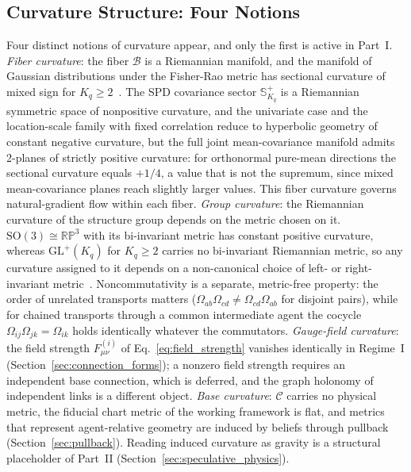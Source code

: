 \subsection{Curvature Structure: Four Notions}

Four distinct notions of curvature appear, and only the first is active in Part~I. \emph{Fiber curvature}: the fiber $\mathcal{B}$ is a Riemannian manifold, and the manifold of Gaussian distributions under the Fisher-Rao metric has sectional curvature of mixed sign for $K_q \geq 2$~\cite{Skovgaard1984}. The SPD covariance sector $\mathbb{S}^+_{K_q}$ is a Riemannian symmetric space of nonpositive curvature, and the univariate case and the location-scale family with fixed correlation reduce to hyperbolic geometry of constant negative curvature, but the full joint mean-covariance manifold admits 2-planes of strictly positive curvature: for orthonormal pure-mean directions the sectional curvature equals $+1/4$, a value that is not the supremum, since mixed mean-covariance planes reach slightly larger values. This fiber curvature governs natural-gradient flow within each fiber. \emph{Group curvature}: the Riemannian curvature of the structure group depends on the metric chosen on it. $\mathrm{SO}(3) \cong \mathbb{RP}^3$ with its bi-invariant metric has constant positive curvature, whereas $\mathrm{GL}^+(K_q)$ for $K_q \geq 2$ carries no bi-invariant Riemannian metric, so any curvature assigned to it depends on a non-canonical choice of left- or right-invariant metric~\cite{Milnor1976}. Noncommutativity is a separate, metric-free property: the order of unrelated transports matters ($\Omega_{ab}\Omega_{cd} \neq \Omega_{cd}\Omega_{ab}$ for disjoint pairs), while for chained transports through a common intermediate agent the cocycle $\Omega_{ij}\Omega_{jk} = \Omega_{ik}$ holds identically whatever the commutators. \emph{Gauge-field curvature}: the field strength $F^{(i)}_{\mu\nu}$ of Eq.~\eqref{eq:field_strength} vanishes identically in Regime~I (Section~\ref{sec:connection_forms}); a nonzero field strength requires an independent base connection, which is deferred, and the graph holonomy of independent links is a different object. \emph{Base curvature}: $\mathcal{C}$ carries no physical metric, the fiducial chart metric of the working framework is flat, and metrics that represent agent-relative geometry are induced by beliefs through pullback (Section~\ref{sec:pullback}). Reading induced curvature as gravity is a structural placeholder of Part~II (Section~\ref{sec:speculative_physics}).

